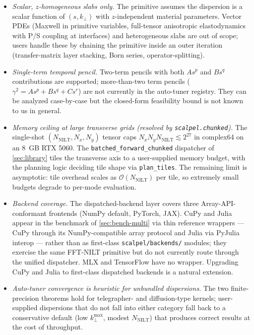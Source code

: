 \documentclass[manuscript,review]{acmart}
\newcommand{\kperp}{k_\perp}
\newcommand{\kpmax}[1][]{k_\perp^{\max#1}}
\begin{document}
\begin{itemize}[leftmargin=*,itemsep=2pt]
\item \emph{Scalar, $z$-homogeneous slabs only.} The primitive
assumes the dispersion is a scalar function of $(s, \kperp)$ with
$z$-independent material parameters. Vector PDEs (Maxwell in
primitive variables, full-tensor anisotropic elastodynamics with
P/S coupling at interfaces) and heterogeneous slabs are out of
scope; users handle these by chaining the primitive inside an
outer iteration (transfer-matrix layer stacking, Born series,
operator-splitting).
\item \emph{Single-term temporal pencil.} Two-term pencils with
both $A s^p$ and $B s^q$ contributions are supported; more-than-two
term pencils ($\gamma^2 = A s^p + B s^q + C s^r$) are not currently
in the auto-tuner registry. They can be analyzed case-by-case but
the closed-form feasibility bound is not known to us in general.
\item \emph{Memory ceiling at large transverse grids (resolved by
\texttt{scalpel.chunked}).} The single-shot
$(N_{\mathrm{NILT}}, N_x, N_y)$ tensor caps $N_x N_y N_{\mathrm{NILT}}
\lesssim 2^{27}$ in complex64 on an 8~GB RTX 5060. The
\texttt{batched\_forward\_chunked} dispatcher of
\cref{sec:library} tiles the transverse axis to a user-supplied
memory budget, with the planning logic deciding tile shape via
\texttt{plan\_tiles}. The remaining limit is asymptotic: tile
overhead scales as $\mathcal{O}(N_{\mathrm{NILT}})$ per tile, so
extremely small budgets degrade to per-mode evaluation.
\item \emph{Backend coverage.} The dispatched-backend layer covers
three Array-API-conformant frontends (NumPy default, PyTorch, JAX).
CuPy and Julia appear in the benchmark of
\cref{sec:bench-multi} via thin reference wrappers --- CuPy through
its NumPy-compatible array protocol and Julia via PyJulia interop ---
rather than as first-class \texttt{scalpel/backends/} modules; they
exercise the same FFT-NILT primitive but do not currently route
through the unified dispatcher. MLX and TensorFlow have no
wrapper. Upgrading CuPy and Julia to first-class dispatched
backends is a natural extension.
\item \emph{Auto-tuner convergence is heuristic for unbundled
dispersions.} The two finite-precision theorems hold for
telegrapher- and diffusion-type kernels; user-supplied dispersions
that do not fall into either category fall back to a conservative
default (low $\kpmax$, modest $N_{\mathrm{NILT}}$) that produces
correct results at the cost of throughput.
\end{itemize}
\end{document}
